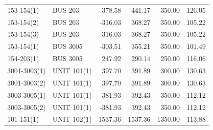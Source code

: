 \documentclass[10pt]{report}
\begin{document}
\begin{table}[H]
{\begin{tabular}{llrrrr}
153-154(1) & BUS 203 & -378.58 & 441.17 & 350.00 & 126.05 \\
153-154(2) & BUS 203 & -316.03 & 368.27 & 350.00 & 105.22 \\
153-154(3) & BUS 203 & -316.03 & 368.27 & 350.00 & 105.22 \\
153-154(1) & BUS 3005 & -303.51 & 355.21 & 350.00 & 101.49 \\
154-203(1) & BUS 3005 & 247.92 & 290.14 & 250.00 & 116.06 \\
3001-3003(1) & UNIT 101(1) & 397.70 & 391.89 & 300.00 & 130.63 \\
3001-3003(2) & UNIT 101(1) & 397.70 & 391.89 & 300.00 & 130.63 \\
3003-3005(1) & UNIT 101(1) & -381.93 & 392.43 & 350.00 & 112.12 \\
3003-3005(2) & UNIT 101(1) & -381.93 & 392.43 & 350.00 & 112.12 \\
101-151(1) & UNIT 102(1) & 1537.36 & 1537.36 & 1350.00 & 113.88 \\
\bottomrule
\end{tabular}}
\end{table}
\end{document}
